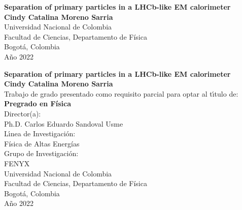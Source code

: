 \begin{center}
\begin{figure}
\centering%
%
\end{figure}
\thispagestyle{empty} \vspace*{2.0cm} \textbf{\huge
Separation of primary particles in a LHCb-like EM calorimeter}\\[6.0cm]
\Large\textbf{Cindy Catalina Moreno Sarria}\\[6.0cm]
\small Universidad Nacional de Colombia\\
Facultad de Ciencias, Departamento de Física\\
Bogotá, Colombia\\
A\~{n}o 2022\\
\end{center}

\newpage{\pagestyle{empty}\cleardoublepage}

\newpage
\begin{center}
\thispagestyle{empty} \vspace*{0cm} \textbf{\huge
Separation of primary particles in a LHCb-like EM calorimeter}\\[3.0cm]
\Large\textbf{Cindy Catalina Moreno Sarria}\\[3.0cm]
\small Trabajo de grado presentado como requisito parcial para optar al
t\'{\i}tulo de:\\
\textbf{Pregrado en Física}\\[2.5cm]
Director(a):\\
Ph.D. Carlos Eduardo Sandoval Usme\\[2.0cm]
L\'{\i}nea de Investigaci\'{o}n:\\
Física de Altas Energías\\
Grupo de Investigaci\'{o}n:\\
FENYX\\[2.5cm]
Universidad Nacional de Colombia\\
Facultad de Ciencias, Departamento de Física\\
Bogotá, Colombia\\
A\~{n}o 2022\\
\end{center}

\newpage{\pagestyle{empty}\cleardoublepage}

\newpage
\thispagestyle{empty} \textbf{}\normalsize



